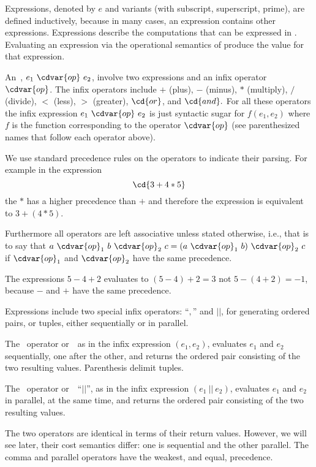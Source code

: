 \begin{gram}[Expressions]
Expressions, denoted by $e$ and variants (with subscript, superscript,
prime), are defined inductively, because in many cases, an expression
contains other expressions.
%
Expressions describe the computations that can be expressed in \pml. 
%
Evaluating an expression via the operational semantics of \pml
produce the value for that expression.
%
\end{gram}

\begin{gram}
An~, $e_1~\cdvar{op}~e_2$, involve two expressions
and an infix operator $\cdvar{op}$.  The infix operators include $+$
(plus), $-$ (minus), $*$ (multiply), $/$ (divide),
$<$ (less), $>$ (greater), $\cd{or}$, and $\cd{and}.$
%
For all these operators the infix expression
$e_1~\cdvar{op}~e_2$ is just syntactic sugar for $f(e_1, e_2)$ where
$f$ is the function corresponding to the operator $\cdvar{op}$ (see
parenthesized names that follow each operator above).  
%

We use standard precedence rules on the operators to indicate their
parsing.  For example in the expression
\[
\cd{3 + 4 * 5}
\]
the $*$ has a higher precedence than $+$ and therefore the
expression is equivalent to $3 + (4 * 5)$. 
%

Furthermore all operators are left associative unless stated
otherwise, i.e., that is to say that $a~\cdvar{op}_1~b~\cdvar{op}_2~c =
(a~\cdvar{op}_1~b)~\cdvar{op}_2~c$ if $\cdvar{op}_1$ and $\cdvar{op}_2$ have the
same precedence.  
\end{gram}

%
\begin{example}
The expressions $5 - 4 + 2$ evaluates to $(5-4) + 2 = 3$ not
$5 - (4 + 2) = -1$, because $-$ and $+$ have the same
precedence.
\end{example}

\begin{gram}
Expressions include two special infix operators: ``$,$'' and
$||$, for generating ordered pairs, or tuples, either
sequentially or in parallel.
%

The~ operator or~~as in the
infix expression $(e_1, e_2)$, evaluates $e_1$ and
$e_2$ sequentially, one after the other, and returns the ordered pair
consisting of the two resulting values.
%
Parenthesis delimit  tuples.
%
%

The~ operator or~~``$||$'',
as in the infix expression
%
$(e_1~||~e_2)$,
%
evaluates $e_1$ and $e_2$ in parallel, at the same time, and
returns the ordered pair consisting of the two resulting values.
%


The two operators are identical in terms of their return values.
%
However, we will see later, their cost semantics differ: one is
sequential and the other parallel.  The comma and parallel operators
have the weakest, and equal, precedence.
%
\end{gram}

